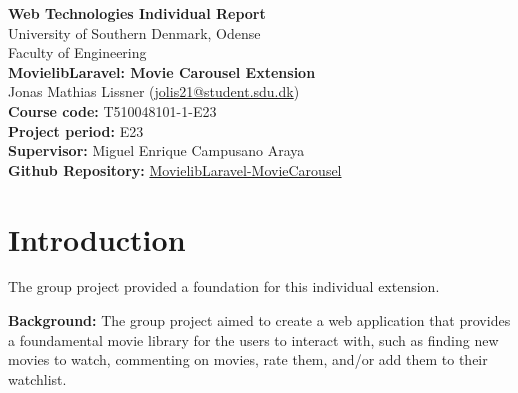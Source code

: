 \documentclass[letterpaper,twocolumn]{article}
\begin{document}
\begin{titlepage}
    \onecolumn

    \vspace*{-2cm}
    \begin{center}
        \Large \textbf{Web Technologies Individual Report} \\
        \vspace*{0.5cm}
        \large University of Southern Denmark, Odense \\
        Faculty of Engineering \\
        \vspace*{4cm}
        \LARGE \textbf{MovielibLaravel: Movie Carousel Extension} \\
        \vspace*{0.5cm}
        \large Jonas Mathias Lissner (\href{mailto:jolis21@student.sdu.dk}{jolis21@student.sdu.dk}) \\
        \vspace*{10cm}
        \textbf{Course code:} T510048101-1-E23 \\
        \vspace*{0.25cm} 
        \textbf{Project period:} E23 \\
        \vspace*{0.25cm}
        \textbf{Supervisor:} Miguel Enrique Campusano Araya \\
        \vspace*{0.25cm}
        \textbf{Github Repository:} \href{https://github.com/Kururururururururu/MovielibLaravel/tree/jonas_individual_part}{MovielibLaravel-MovieCarousel}
    \end{center}

    \thispagestyle{empty}

    \clearpage
    \twocolumn
\end{titlepage}




\section{Introduction}
The group project provided a foundation for this individual extension.

\textbf{Background:}
The group project aimed to create a web application that provides a foundamental movie library for the users to interact with, such as finding new movies to watch, 
commenting on movies, rate them, and/or add them to their watchlist.
\end{document}
